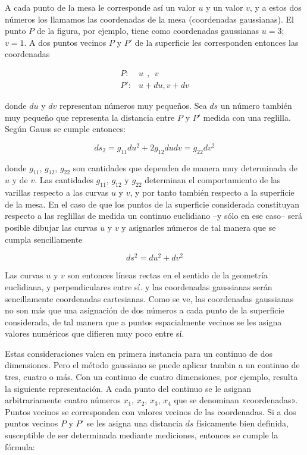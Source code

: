 \documentclass[spanish]{book}
\begin{document}
A cada punto de la mesa le corresponde así un valor $u$ y un valor $v$, y a estos dos
números los llamamos las coordenadas de la mesa (coordenadas gaussianas). El punto
$P$ de la figura, por ejemplo, tiene como coordenadas gaussianas $u = 3$; $v = 1$. A dos
puntos vecinos $P$ y $P'$ de la superficie les corresponden entonces las coordenadas

\begin{eqnarray*}
P: & u~~,~~v\\
P': & u+du,v+dv
\end{eqnarray*}

donde $du$ y $dv$ representan números muy pequeños. Sea $ds$ un número también muy
pequeño que representa la distancia entre $P$ y $P'$ medida con una reglilla. Según Gauss
se cumple entonces:

\[ds_{2}=g_{11}du^{2}+2g_{12}dudv=g_{22}dv^{2}\]

\noindent donde $g_{11}$, $g_{12}$, $g_{22}$ son cantidades que dependen de manera muy determinada de $u$ y de
$v$. Las cantidades $g_{11}$, $g_{12}$ y $g_{22}$ determinan el comportamiento de las varillas respecto a
las curvas $u$ y $v$, y por tanto también respecto a la superficie de la mesa. En el caso de
que los puntos de la superficie considerada constituyan respecto a las reglillas de
medida un continuo euclidiano --y sólo en ese caso-- será posible dibujar las curvas $u$
y $v$ y asignarles números de tal manera que se cumpla sencillamente

\[ds^{2}=du^{2}+dv^{2}\]

Las curvas $u$ y $v$ son entonces líneas rectas en el sentido de la geometría euclidiana, y
perpendiculares entre sí. y las coordenadas gaussianas serán sencillamente coordenadas
cartesianas. Como se ve, las coordenadas gaussianas no son más que una asignación de
dos números a cada punto de la superficie considerada, de tal manera que a puntos
espacialmente vecinos se les asigna valores numéricos que difieren muy poco entre
sí.

Estas consideraciones valen en primera instancia para un continuo de dos
dimensiones. Pero el método gaussiano se puede aplicar tambin a un continuo de tres,
cuatro o más. Con un continuo de cuatro dimensiones, por ejemplo, resulta la
siguiente representación. A cada punto del continuo se le asignan arbitrariamente
cuatro números $x_{1}$, $x_{2}$, $x_{3}$, $x_{4}$ que se denominan «coordenadas». Puntos vecinos se
corresponden con valores vecinos de las coordenadas. Si a dos puntos vecinos $P$ y $P'$ se
les asigna una distancia $ds$ físicamente bien definida, susceptible de ser determinada
mediante mediciones, entonces se cumple la fórmula:
\end{document}
